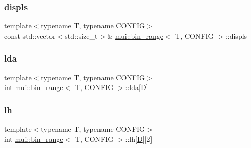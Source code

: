 \mbox{\label{structmui_1_1bin__range_a03f6cc1480f9233acea769dc0bfe26e9}} 
\subsubsection{\texorpdfstring{displs}{displs}}
{\footnotesize\ttfamily template$<$typename T, typename C\+O\+N\+F\+IG$>$ \\
const std\+::vector$<$std\+::size\+\_\+t$>$\& \hyperlink{structmui_1_1bin__range}{mui\+::bin\+\_\+range}$<$ T, C\+O\+N\+F\+IG $>$\+::displs}

\mbox{\label{structmui_1_1bin__range_a78d3c699b3a7844bcf57007f6133eabf}} 
\subsubsection{\texorpdfstring{lda}{lda}}
{\footnotesize\ttfamily template$<$typename T, typename C\+O\+N\+F\+IG$>$ \\
int \hyperlink{structmui_1_1bin__range}{mui\+::bin\+\_\+range}$<$ T, C\+O\+N\+F\+IG $>$\+::lda\mbox{[}\hyperlink{structmui_1_1bin__range_a808a42cd40f43cf33068640f6b86bf27}{D}\mbox{]}}

\mbox{\label{structmui_1_1bin__range_a5bb17a3c008ee08377fb19edefec8227}} 
\subsubsection{\texorpdfstring{lh}{lh}}
{\footnotesize\ttfamily template$<$typename T, typename C\+O\+N\+F\+IG$>$ \\
int \hyperlink{structmui_1_1bin__range}{mui\+::bin\+\_\+range}$<$ T, C\+O\+N\+F\+IG $>$\+::lh\mbox{[}\hyperlink{structmui_1_1bin__range_a808a42cd40f43cf33068640f6b86bf27}{D}\mbox{]}\mbox{[}2\mbox{]}}

\mbox{\label{structmui_1_1bin__range_aaebd096de3e37d0c13fd27722d3fbb5e}} 
